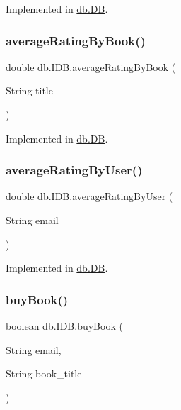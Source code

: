 Implemented in \hyperlink{classdb_1_1_d_b_accfa7c2f48252f167576221dc14ff721}{db.\+DB}.

\mbox{\label{interfacedb_1_1_i_d_b_a4d23da2e383e7fe0638089fb2686b6c3}} 
\subsubsection{\texorpdfstring{average\+Rating\+By\+Book()}{averageRatingByBook()}}
{\footnotesize\ttfamily double db.\+I\+D\+B.\+average\+Rating\+By\+Book (\begin{DoxyParamCaption}\item[{String}]{title }\end{DoxyParamCaption})}



Implemented in \hyperlink{classdb_1_1_d_b_a8b2b9d6c4aabb17719e2d2af4cf7ba74}{db.\+DB}.

\mbox{\label{interfacedb_1_1_i_d_b_a5bb2209c976ab0a7f20606ed5df0e0cf}} 
\subsubsection{\texorpdfstring{average\+Rating\+By\+User()}{averageRatingByUser()}}
{\footnotesize\ttfamily double db.\+I\+D\+B.\+average\+Rating\+By\+User (\begin{DoxyParamCaption}\item[{String}]{email }\end{DoxyParamCaption})}



Implemented in \hyperlink{classdb_1_1_d_b_a38091677ae1e964a84320d6e539ea62e}{db.\+DB}.

\mbox{\label{interfacedb_1_1_i_d_b_a2ac985a90e8369fab676950b3fb4c2bc}} 
\subsubsection{\texorpdfstring{buy\+Book()}{buyBook()}}
{\footnotesize\ttfamily boolean db.\+I\+D\+B.\+buy\+Book (\begin{DoxyParamCaption}\item[{String}]{email,  }\item[{String}]{book\+\_\+title }\end{DoxyParamCaption})}



